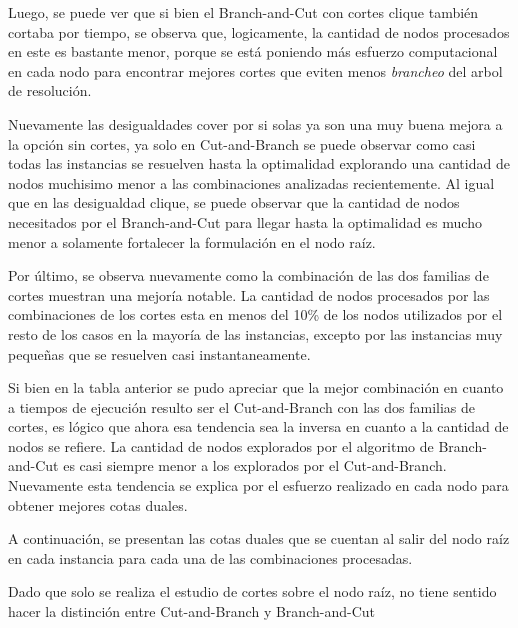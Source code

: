 Luego, se puede ver que si bien el Branch-and-Cut con cortes clique tambi\'en cortaba por tiempo, se observa que, logicamente, la cantidad de nodos procesados en este es bastante menor, porque se est\'a poniendo m\'as esfuerzo computacional en cada nodo para encontrar mejores cortes que eviten menos \emph{brancheo} del arbol de resoluci\'on.



Nuevamente las desigualdades cover por si solas ya son una muy buena mejora a la opci\'on sin cortes, ya solo en Cut-and-Branch se puede observar como casi todas las instancias se resuelven hasta la optimalidad explorando una cantidad de nodos muchisimo menor a las combinaciones analizadas recientemente. Al igual que en las desigualdad clique, se puede observar que la cantidad de nodos necesitados por el Branch-and-Cut para llegar hasta la optimalidad es mucho menor a solamente fortalecer la formulaci\'on en el nodo ra\'iz.


Por \'ultimo, se observa nuevamente como la combinaci\'on de las dos familias de cortes muestran una mejor\'ia notable. La cantidad de nodos procesados por las combinaciones de los cortes esta en menos del 10\% de los nodos utilizados por el resto de los casos en la mayor\'ia de las instancias, excepto por las instancias muy peque\~nas que se resuelven casi instantaneamente.

Si bien en la tabla anterior se pudo apreciar que la mejor combinaci\'on en cuanto a tiempos de ejecuci\'on resulto ser el Cut-and-Branch con las dos familias de cortes, es l\'ogico que ahora esa tendencia sea la inversa en cuanto a la cantidad de nodos se refiere. La cantidad de nodos explorados por el algoritmo de Branch-and-Cut es casi siempre menor a los explorados por el Cut-and-Branch. Nuevamente esta tendencia se explica por el esfuerzo realizado en cada nodo para obtener mejores cotas duales.

\newpage

A continuaci\'on, se presentan las cotas duales que se cuentan al salir del nodo ra\'iz en cada instancia para cada una de las combinaciones procesadas.

Dado que solo se realiza el estudio de cortes sobre el nodo ra\'iz, no tiene sentido hacer la distinci\'on entre Cut-and-Branch y Branch-and-Cut



